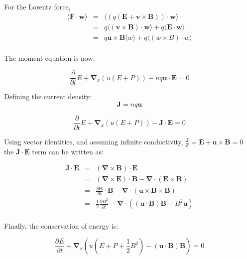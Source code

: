 For the Lorentz force, 
\begin{eqnarray*}
\langle \mathbf{F \cdot w} \rangle
&=&
\langle
\left(
q
\left(
\mathbf{E + v \times B}
\right)
\right)
\cdot
\mathbf{w}
\rangle\\
&=&
q \langle \mathbf{\left( v \times B \right) \cdot  w} \rangle
+
q \langle \mathbf{E \cdot w} \rangle
\\
&=&
q \mathbf{u \times B} \langle w \rangle
+
q \langle \left(  w \times B  \right)  \cdot w \rangle
\\
\end{eqnarray*}


The moment equation is now:

\begin{equation}
\frac{\partial}{\partial t}E
+
{\boldsymbol{\nabla}}_x
\left(
u \left( E +P \right)
\right)
-
nq\mathbf{u \cdot E}
=0
\end{equation}

Defining the current density:
\begin{equation}
\mathbf{J} = n q \mathbf{u}
\end{equation}


\begin{equation}
\frac{\partial}{\partial t}E
+
{\boldsymbol{\nabla}}_x
\left(
u \left( E +P \right)
\right)
-
\mathbf{J \cdot E}
=0
\end{equation}

Using vector identities, and assuming infinite conductivity,  $\frac{\mathbf J }{\sigma}= \mathbf {E + u \times B} =0$ the $ \mathbf{J \cdot E} $ term can be written as:

\begin{eqnarray*}
 \mathbf{J \cdot E}
&=& 
  \mathbf{ \left( \boldsymbol{\nabla} \times B \right) \cdot E}
 \\
&=& 
  \mathbf{ \left( \boldsymbol{\nabla} \times E \right) \cdot B} -  \boldsymbol{\nabla} \cdot \left( \mathbf{E \times B} \right)
 \\
&=& 
   \frac{\partial \mathbf{B} }{\partial t} \cdot \mathbf{B} -  \boldsymbol{\nabla} \cdot \left( \mathbf{ u \times B  \times B} \right)
 \\
&=& 
  \frac{1}{2} \frac{\partial B^2 }{\partial t}  -  \boldsymbol{\nabla} \cdot \left( \mathbf{ \left( u \cdot B \right)  B } - B^2 \mathbf{u} \right)
 \\
\end{eqnarray*}

 
Finally, the conservation of energy is:

\begin{equation}
\frac{\partial E}{\partial t}
+
{\boldsymbol{\nabla}}_x
\left(
u \left( E +P + \frac{1}{2} B^2 \right)
- \mathbf{ \left( u \cdot B \right)  B }
\right)
=0
\end{equation}

